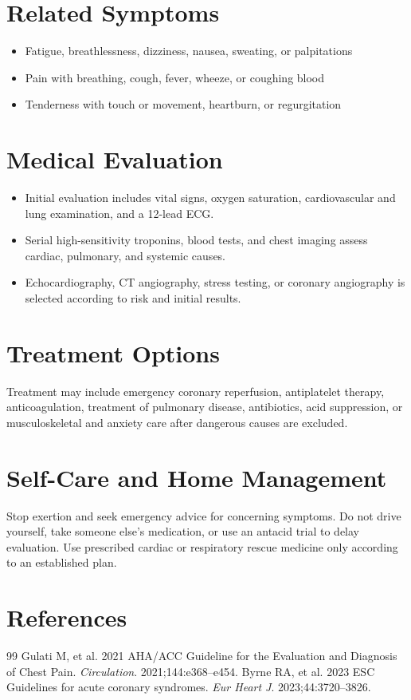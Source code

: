 \section*{Related Symptoms}
\begin{itemize}
  \item Fatigue, breathlessness, dizziness, nausea, sweating, or palpitations
  \item Pain with breathing, cough, fever, wheeze, or coughing blood
  \item Tenderness with touch or movement, heartburn, or regurgitation
\end{itemize}

\section*{Medical Evaluation}
\begin{itemize}
  \item Initial evaluation includes vital signs, oxygen saturation, cardiovascular and lung examination, and a 12-lead ECG.
  \item Serial high-sensitivity troponins, blood tests, and chest imaging assess cardiac, pulmonary, and systemic causes.
  \item Echocardiography, CT angiography, stress testing, or coronary angiography is selected according to risk and initial results.
\end{itemize}

\section*{Treatment Options}
Treatment may include emergency coronary reperfusion, antiplatelet therapy, anticoagulation, treatment of pulmonary disease, antibiotics, acid suppression, or musculoskeletal and anxiety care after dangerous causes are excluded.

\section*{Self-Care and Home Management}
Stop exertion and seek emergency advice for concerning symptoms. Do not drive yourself, take someone else’s medication, or use an antacid trial to delay evaluation. Use prescribed cardiac or respiratory rescue medicine only according to an established plan.

\section*{References}
\begin{thebibliography}{99}
 Gulati M, et al. 2021 AHA/ACC Guideline for the Evaluation and Diagnosis of Chest Pain. \textit{Circulation}. 2021;144:e368--e454.
 Byrne RA, et al. 2023 ESC Guidelines for acute coronary syndromes. \textit{Eur Heart J}. 2023;44:3720--3826.
\end{thebibliography}
